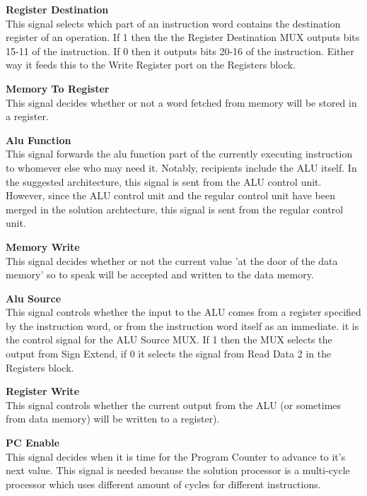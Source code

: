 \begin{description}
    \item{\textbf{Register Destination}} \\
This signal selects which part of an instruction word contains the destination register of an operation.
If 1 then the the Register Destination MUX outputs bits 15-11 of the instruction. If 0 then it outputs bits 20-16 of the instruction.
Either way it feeds this to the Write Register port on the Registers block.

\item{\textbf{Memory To Register}} \\
This signal decides whether or not a word fetched from memory will be stored in a register.

\item{\textbf{Alu Function}} \\
This signal forwards the alu function part of the currently executing instruction to whomever else who may need it.
Notably, recipients include the ALU itself.
In the suggested architecture, this signal is sent from the ALU control unit.
However, since the ALU control unit and the regular control unit have been merged in the solution archtecture, this signal is sent from the regular control unit.

\item{\textbf{Memory Write}} \\
This signal decides whether or not the current value 'at the door of the data memory' so to speak will be accepted and written to the data memory.

\item{\textbf{Alu Source}} \\
This signal controls whether the input to the ALU comes from a register specified by the instruction word, or from the instruction word itself as an immediate.
it is the control signal for the ALU Source MUX.
If 1 then the MUX selects the output from Sign Extend, if 0 it selects the signal from Read Data 2 in the Registers block.

\item{\textbf{Register Write}} \\
This signal controls whether the current output from the ALU (or sometimes from data memory) will be written to a register).

\item{\textbf{PC Enable}} \\
This signal decides when it is time for the Program Counter to advance to it's next value.
This signal is needed because the solution processor is a multi-cycle processor which uses different amount of cycles for different instructions.


\end{description}
